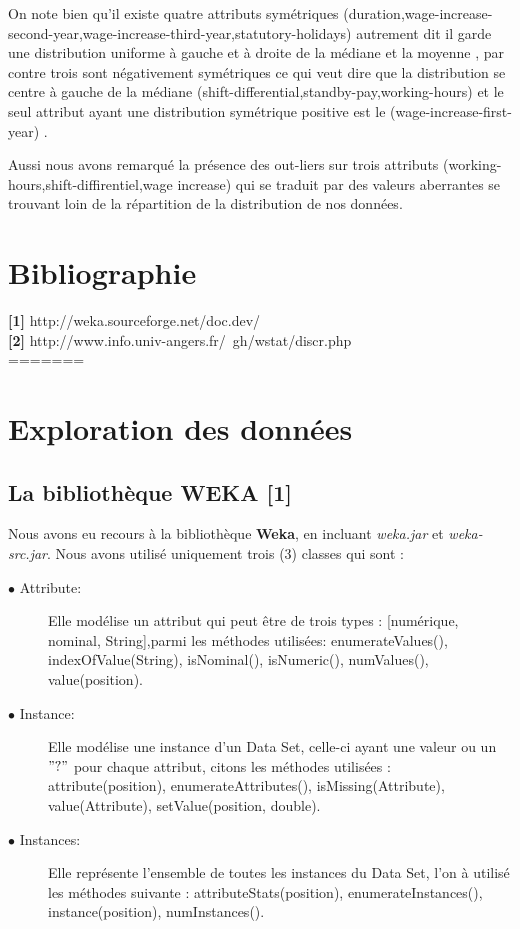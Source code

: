 \documentclass[12pt,a4paper,oneside]{book}
\begin{document}
	On note bien qu'il existe quatre attributs symétriques (duration,wage-increase-second-year,wage-increase-third-year,statutory-holidays) autrement dit il garde une distribution uniforme à gauche et à droite de la médiane et la moyenne , par contre trois sont  négativement symétriques ce qui veut dire que la distribution se centre à gauche de la médiane (shift-differential,standby-pay,working-hours) et le seul attribut ayant une distribution symétrique positive est le (wage-increase-first-year) .
	
	Aussi nous avons remarqué la présence des out-liers sur trois attributs (working-hours,shift-diffirentiel,wage increase) qui se traduit par des valeurs aberrantes se trouvant loin de la répartition de la distribution de nos données.
	
	
	
	\chapter*{Bibliographie}
	
	\textbf{[1]} http://weka.sourceforge.net/doc.dev/\\
	\textbf{[2]} http://www.info.univ-angers.fr/~gh/wstat/discr.php\\
=======

\setcounter{tocdepth}{2}
\tableofcontents
\newpage
\listoffigures
\newpage

\chapter{Exploration des données}
\section{La bibliothèque WEKA [1]}
Nous avons eu recours à la bibliothèque \textbf{Weka}, en incluant \textit{weka.jar} et \textit{weka-src.jar}.
Nous avons utilisé uniquement trois (3) classes qui sont :
\begin{description}
	\item[$\bullet$ Attribute:] Elle modélise un attribut qui peut être de trois types : [numérique, nominal, String],parmi les méthodes utilisées: enumerateValues(), indexOfValue(String), isNominal(), isNumeric(), numValues(), value(position).
	  
	\item[$\bullet$ Instance:] Elle modélise une instance d'un Data Set, celle-ci ayant une valeur ou un $"?"$ pour chaque attribut, citons les méthodes utilisées : attribute(position), enumerateAttributes(), isMissing(Attribute), value(Attribute), setValue(position, double).
	
	\item[$\bullet$ Instances:] Elle représente l'ensemble de toutes les instances du Data Set, l'on à utilisé les méthodes suivante : attributeStats(position), enumerateInstances(), instance(position), numInstances(). 
\end{description}
\end{document}
